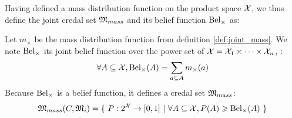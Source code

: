 Having defined a mass distribution function on the product space $\mathcal{X}$, we thus define the joint credal set $\mathfrak{M}_{mass}$ and its belief function $\mathrm{Bel}_\times$ as:
\begin{definition}\label{def:cumulative_masses_credal_set}
    Let $m_\times$ be the mass distribution function from definition \ref{def:joint_mass}. We note $\mathrm{Bel}_\times$ its joint belief function over the power set of $\mathcal{X}=\mathcal{X}_1\times\dots\times \mathcal{X}_n$, \ie:
    \begin{align}
        \forall A\subseteq\mathcal{X}, \mathrm{Bel}_\times(A)=\sum_{a\subseteq A}m_\times(a)\label{eq:joint_belief}
    \end{align}
    Because $\mathrm{Bel}_\times$ is a belief function, it defines a credal set $\mathfrak{M}_{mass}$:
    \begin{eqnarray}
        \mathfrak{M}_{mass}(C,\mathfrak{M}_i) = \{~P:2^{\mathcal{X}}\rightarrow [0,1] ~|~ \forall A\subseteq\mathcal{X}, P(A)\geqslant \mathrm{Bel}_\times(A)~\}\label{eq:credal_set_mass}
    \end{eqnarray}
\end{definition}

